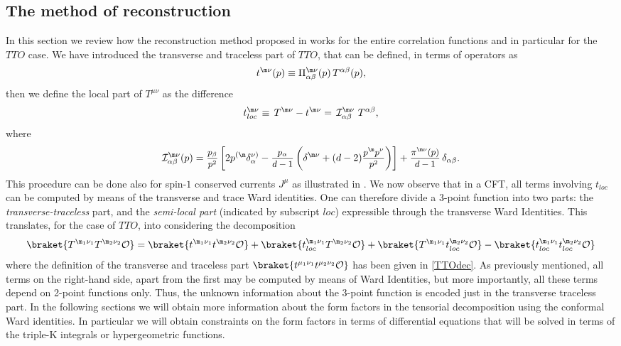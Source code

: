 \documentclass[a4paper,11pt,openright,twoside]{book}
\newcommand{\mO}{\mathcal{O}}
\let\a=\alpha   \let\b=\beta   \let\g=\gamma   \let\d=\delta
\let\n=\nu      \let\x=\xi     \let\p=\pi      \let\r=\rho
\newcommand{\sdfrac}[2]{\mbox{\small$\displaystyle\frac{#1}{#2}$}}
\numberwithin{equation}{section}
\begin{document}
{{\subsection{The method of reconstruction}
In this section we review how the reconstruction method proposed in \cite{Bzowski:2013sza} works for the entire correlation functions and in particular for the $TTO$ case. We have introduced the transverse and traceless part of $TTO$, that can be defined, in terms of operators as
\begin{equation}
	t^{\m\n}(p)\equiv \Pi^{\m\n}_{\a\b}(p)\,T^{\a\b}(p),
\end{equation}
then we define the local part of $T^{\mu\nu}$ as the difference
\begin{equation}
	t^{\m\n}_{loc}\equiv\,T^{\m\n}-t^{\m\n}=\,\mathcal I^{\m\n}_{\a\b}\ T^{\a\b},
\end{equation}
where
\begin{equation}
	\mathcal{I}^{\m\n}_{\a\b}(p)=\sdfrac{p_\beta}{p^2}\left[2p^{(\m}\d^{\n)}_\a-\sdfrac{p_\a}{d-1}\left(\d^{\m\n}+(d-2)\sdfrac{p^\m p^\n}{p^2}\right)\right]+\sdfrac{\pi^{\m\n}(p)}{d-1}\,\d_{\a\b}.\label{itensor}
\end{equation}
This procedure can be done also for spin-$1$ conserved currents $J^\mu$ as illustrated in \cite{Bzowski:2013sza}. 
We now observe that in a CFT, all terms involving $t_{loc}$ can be computed by means of the transverse and trace Ward identities. One can therefore divide a 3-point function into two parts: the \emph{transverse-traceless} part, and the \emph{semi-local part} (indicated by subscript $loc$) expressible through the transverse Ward Identities. This translates, for the case of $TTO$, into considering the decomposition
\begin{equation}
	\braket{T^{\m_1\n_1}T^{\m_2\n_2}\mO}=\braket{t^{\m_1\n_1}t^{\m_2\n_2}\mO}+\braket{t_{loc}^{\m_1\n_1}T^{\m_2\n_2}\mO}+\braket{T^{\m_1\n_1}t_{loc}^{\m_2\n_2}\mO}-\braket{t_{loc}^{\m_1\n_1}t_{loc}^{\m_2\n_2}\mO}\label{reconstr}
\end{equation}
where the definition of the transverse and traceless part $\braket{t^{\mu_1\nu_1}t^{\mu_2\nu_2}\mathcal{O}}$ has been given in \eqref{TTOdec}. As previously mentioned, all terms on the right-hand side, apart from the first may be computed by means of Ward Identities, but more importantly, all these terms depend on 2-point functions only. Thus, the unknown information about the $3$-point function is encoded just in the transverse traceless part. 
In the following sections we will obtain more information about the form factors in the tensorial decomposition using the conformal Ward identities. In particular we will obtain constraints on the form factors in terms of differential equations that will be solved in terms of the triple-K integrals or hypergeometric functions. 


}}
\end{document}
